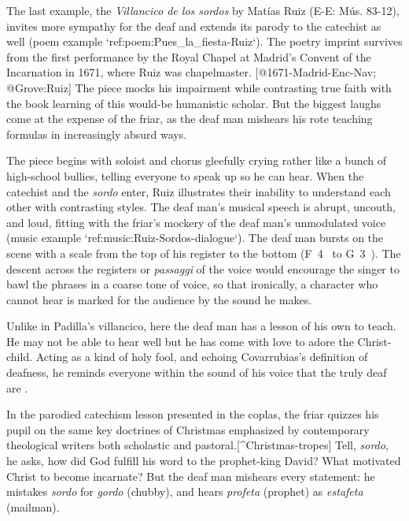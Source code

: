 The last example, the \emph{Villancico de los sordos} by Matías Ruiz (E-E: Mús.
83-12), invites more sympathy for the deaf and extends its parody to the catechist as well (poem example `ref:poem:Pues_la_fiesta-Ruiz`).
The poetry imprint survives from the first performance by the Royal Chapel at Madrid's Convent of the Incarnation in 1671, where Ruiz was chapelmaster.
[@1671-Madrid-Enc-Nav; @Grove:Ruiz]
The piece mocks his impairment while contrasting true faith with the book learning of this would-be humanistic scholar.
But the biggest laughs come at the expense of the friar, as the deaf man mishears his rote teaching formulas in increasingly absurd ways.


\label{poem:Pues_la_fiesta-Ruiz}

The piece begins with soloist and chorus gleefully crying  rather like a bunch of high-school bullies, telling everyone to speak up so he can hear.
When the catechist and the \emph{sordo} enter, Ruiz illustrates their inability to understand each other with contrasting styles.
The deaf man's musical speech is abrupt, uncouth, and loud, fitting with the friar's mockery of the deaf man's unmodulated voice  (music example `ref:music:Ruiz-Sordos-dialogue`).
The deaf man bursts on the scene with a scale from the top of his register to the bottom (F~4~ to G~3~).
The descent across the registers or \emph{passaggi} of the voice would encourage the singer to bawl the phrases in a coarse tone of voice, so that ironically, a character who cannot hear is marked for the audience by the sound he makes.


\label{music:Ruiz-Sordos-dialogue}

Unlike in Padilla's villancico, here the deaf man has a lesson of his own to teach.
He may not be able to hear well but he has come with love to adore the Christ-child.
Acting as a kind of holy fool, and echoing Covarrubias's definition of deafness, he reminds everyone within the sound of his voice that the truly deaf are .

In the parodied catechism lesson presented in the coplas, the friar quizzes his pupil on the same key doctrines of Christmas emphasized by contemporary theological writers both scholastic and pastoral.[^Christmas-tropes]  Tell, \emph{sordo}, he asks, how did God fulfill his word to the prophet-king David? What motivated Christ to become incarnate? But the deaf man mishears every statement: he mistakes \emph{sordo} for \emph{gordo} (chubby), and hears \emph{profeta} (prophet) as \emph{estafeta} (mailman).

